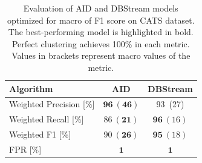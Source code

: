 \documentclass{article}
\begin{document}
\begin{enumerate}
        \begin{table}[htbp]
            \caption{Evaluation of AID and DBStream models optimized for macro of F1 score on CATS dataset. The best-performing model is highlighted in bold. Perfect clustering achieves 100\% in each metric. Values in brackets represent macro values of the metric.}
            \begin{center}
                \label{tab:perf_comp_multiclass}
                \begin{tabular}{|l|c|c|}
                    \hline
                    \textbf{Algorithm}        & AID               & DBStream \\
                    \hline
                    Weighted Precision [$\%$] & $\boldsymbol{96}~(\boldsymbol{46})$ & 93~(27)       \\
                    \hline
                    Weighted Recall [$\%$]    & $86~(\boldsymbol{21})$ & $\boldsymbol{96}~(16)$        \\
                    \hline
                    Weighted F1 [$\%$]        & $90~(\boldsymbol{26})$ & $\boldsymbol{95}~(18)$        \\
                    \hline
                    FPR [$\%$]        & $\boldsymbol{1}$ & $\boldsymbol{1}$        \\
                    \hline
                \end{tabular}
            \end{center}
        \end{table}


\end{enumerate}
\end{document}
